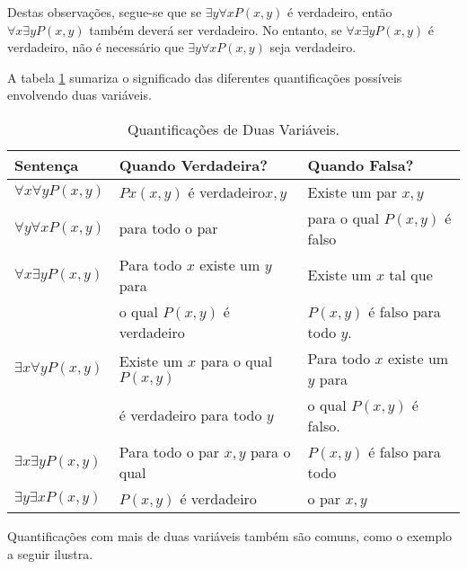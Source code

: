 Destas observações, segue-se que se $\exists y\forall xP(x,y)$ é verdadeiro,
então $\forall x\exists yP(x,y)$ também deverá ser verdadeiro. No entanto,
se $\forall x\exists yP(x,y)$ é verdadeiro, não é necessário que $\exists
y\forall xP(x,y)$ seja verdadeiro.

A tabela \ref{tab119} sumariza o significado das diferentes quantificações
possíveis envolvendo duas variáveis.

\begin{table}[H]
\centering
\begin{tabular}{|l|l|l|}%
\toprule
\textbf{Sentença} & \textbf{Quando Verdadeira?} & \textbf{Quando Falsa?} \\ 
\midrule
$\forall x\forall yP(x,y)$	& $Px(x,y)$ é verdadeiro$x,y$ &
Existe um par $x,y$\\
$\forall y\forall xP(x,y)$ & para todo o par & para o qual $P(x,y)$ é falso\\
\midrule
$\forall x\exists yP(x,y)$ & Para todo $x$ existe um $y$ para & Existe um $x$
tal que\\
& o qual $P(x,y)$ é verdadeiro & $P(x,y)$ é falso para todo $y$.\\
\midrule
$\exists x\forall yP(x,y)$ & Existe um $x$ para o qual $P(x,y)$ & Para todo $x$
existe um $y$ para\\
& é verdadeiro para todo $y$ & o qual $P(x,y)$ é falso.\\
\midrule
$\exists x\exists yP(x,y)$ & Para todo o par $x,y$ para o qual & $P(x,y)$ é
falso para todo\\
$\exists y\exists xP(x,y)$ & $P(x,y)$ é verdadeiro & o par $x,y$\\
\bottomrule%
\end{tabular}%
\caption{Quantificações de Duas Variáveis.}
\label{tab119}
\end{table}

Quantificações com mais de duas variáveis também são comuns, como o exemplo a
seguir ilustra.

